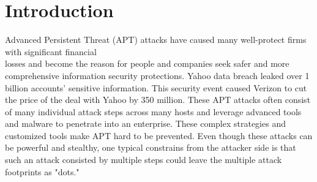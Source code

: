 \section{Introduction}
Advanced Persistent Threat (APT) attacks\cite{fireeye:anatomy,aptsymantec} have caused many well-protect firms with significant financial\\ losses\cite{ebay,opm,target,homedepot} and become the reason for people and companies seek safer and more comprehensive information security protections. Yahoo data breach leaked over 1 billion accounts' sensitive information. This security event caused Verizon to cut the price of the deal with Yahoo by 350 million\cite{ya:yahooleak,aptsymantec}. These APT attacks often consist of many individual attack steps across many hosts and leverage advanced tools and malware to penetrate into an enterprise\cite{fireeye:anatomy,aptsymantec}. These complex strategies and customized tools make APT hard to be prevented. Even though these attacks can be powerful and stealthy, one typical constrains from the attacker side is that such an attack consisted by multiple steps could leave the multiple attack footprints as "dots."


